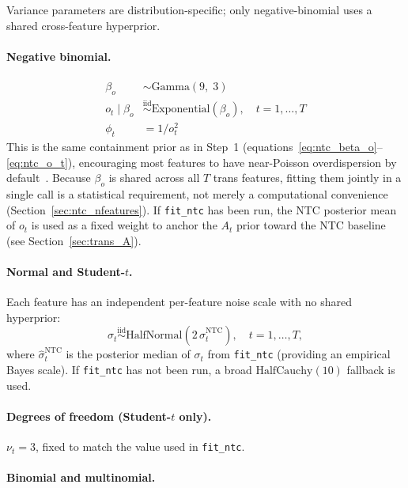 \documentclass[12pt]{article}
\newcommand{\given}{\mid}
\newcommand{\iid}{\overset{\mathrm{iid}}{\sim}}
\begin{document}
Variance parameters are distribution-specific; only negative-binomial uses a shared
cross-feature hyperprior.

\paragraph{Negative binomial.}

\begin{align}
  \beta_o &\sim \mathrm{Gamma}(9,\; 3) \label{eq:trans_beta_o} \\
  o_t \given \beta_o &\iid \mathrm{Exponential}(\beta_o), \quad t = 1,\ldots,T \label{eq:trans_o_t} \\
  \phi_t &= 1/o_t^2
\end{align}
%
This is the same containment prior as in Step~1
(equations~\ref{eq:ntc_beta_o}--\ref{eq:ntc_o_t}),
encouraging most features to have near-Poisson overdispersion by
default~\cite{kleshchevnikov2022}.
Because $\beta_o$ is shared across all $T$ trans features, fitting them jointly in a single
call is a statistical requirement, not merely a computational convenience
(Section~\ref{sec:ntc_nfeatures}).
If \texttt{fit\_ntc} has been run, the NTC posterior mean of $o_t$ is used as a fixed
weight to anchor the $A_t$ prior toward the NTC baseline (see Section~\ref{sec:trans_A}).

\paragraph{Normal and Student-$t$.}

Each feature has an independent per-feature noise scale with no shared hyperprior:
\begin{equation}
  \sigma_t \iid \mathrm{HalfNormal}\!\left(2\,\hat\sigma_t^{\mathrm{NTC}}\right),
  \quad t = 1,\ldots,T,
\end{equation}
where $\hat\sigma_t^{\mathrm{NTC}}$ is the posterior median of $\sigma_t$ from
\texttt{fit\_ntc} (providing an empirical Bayes scale).
If \texttt{fit\_ntc} has not been run, a broad $\mathrm{HalfCauchy}(10)$ fallback is used.

\paragraph{Degrees of freedom (Student-$t$ only).}

$\nu_t = 3$, fixed to match the value used in \texttt{fit\_ntc}.

\paragraph{Binomial and multinomial.}
\end{document}
